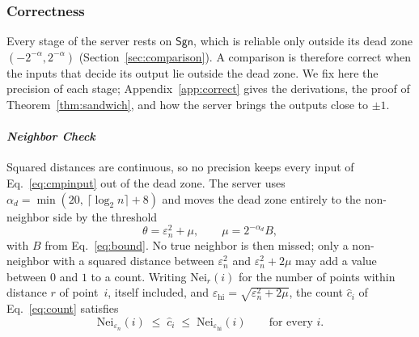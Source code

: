 
\subsubsection{Correctness}
\label{sec:correct}

Every stage of the server rests on $\mathsf{Sgn}$, which is reliable only
outside its dead zone $(-2^{-\alpha}, 2^{-\alpha})$
(Section~\ref{sec:comparison}). A comparison is therefore correct when
the inputs that decide its output lie outside the dead zone. We fix here
the precision of each stage; Appendix~\ref{app:correct} gives the
derivations, the proof of Theorem~\ref{thm:sandwich}, and how the server
brings the outputs close to $\pm 1$.

\paragraph{\emph{Neighbor Check}}
Squared distances are continuous, so no precision keeps every input of
Eq.~\eqref{eq:cmpinput} out of the dead zone. The server uses
$\alpha_d = \min(20,\, \lceil \log_2 n \rceil + 8)$ and moves the dead
zone entirely to the non-neighbor side by the threshold
\begin{equation}
  \label{eq:theta}
  \theta = \varepsilon_n^2 + \mu,
  \qquad \mu = 2^{-\alpha_d} B ,
\end{equation}
with $B$ from Eq.~\eqref{eq:bound}. No true neighbor is then missed; only
a non-neighbor with a squared distance between $\varepsilon_n^2$ and
$\varepsilon_n^2 + 2\mu$ may add a value between $0$ and $1$ to a count.
Writing $\mathrm{Nei}_r(i)$ for the number of points within distance $r$
of point~$i$, itself included, and
$\varepsilon_{\mathrm{hi}} = \sqrt{\varepsilon_n^2 + 2\mu}$, the count
$\hat{c}_i$ of Eq.~\eqref{eq:count} satisfies
\begin{equation}
  \label{eq:sandwich}
  \mathrm{Nei}_{\varepsilon_n}(i) \;\le\; \hat{c}_i \;\le\;
  \mathrm{Nei}_{\varepsilon_{\mathrm{hi}}}(i)
  \qquad \text{for every } i .
\end{equation}

